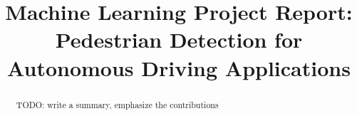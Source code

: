 \documentclass[10pt,twocolumn,letterpaper]{article}
\title{Machine Learning Project Report: \\
Pedestrian Detection for Autonomous Driving Applications}
\author{}
\begin{document}
\maketitle

\begin{abstract}
{TODO: write a summary, emphasize the contributions}
\end{abstract}








\end{document}
